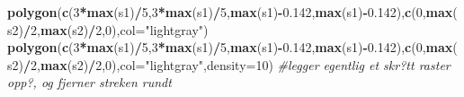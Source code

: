 \documentclass[]{article}
\newenvironment{Shaded}{\begin{snugshade}}{\end{snugshade}}
\newcommand{\CommentTok}[1]{\textcolor[rgb]{0.56,0.35,0.01}{\textit{#1}}}
\newcommand{\DataTypeTok}[1]{\textcolor[rgb]{0.13,0.29,0.53}{#1}}
\newcommand{\DecValTok}[1]{\textcolor[rgb]{0.00,0.00,0.81}{#1}}
\newcommand{\FloatTok}[1]{\textcolor[rgb]{0.00,0.00,0.81}{#1}}
\newcommand{\KeywordTok}[1]{\textcolor[rgb]{0.13,0.29,0.53}{\textbf{#1}}}
\newcommand{\NormalTok}[1]{#1}
\newcommand{\OperatorTok}[1]{\textcolor[rgb]{0.81,0.36,0.00}{\textbf{#1}}}
\newcommand{\StringTok}[1]{\textcolor[rgb]{0.31,0.60,0.02}{#1}}
\begin{document}
\begin{Shaded}
\begin{Highlighting}[]
\KeywordTok{polygon}\NormalTok{(}\KeywordTok{c}\NormalTok{(}\DecValTok{3}\OperatorTok{*}\KeywordTok{max}\NormalTok{(s1)}\OperatorTok{/}\DecValTok{5}\NormalTok{,}\DecValTok{3}\OperatorTok{*}\KeywordTok{max}\NormalTok{(s1)}\OperatorTok{/}\DecValTok{5}\NormalTok{,}\KeywordTok{max}\NormalTok{(s1)}\OperatorTok{-}\FloatTok{0.142}\NormalTok{,}\KeywordTok{max}\NormalTok{(s1)}\OperatorTok{-}\FloatTok{0.142}\NormalTok{),}\KeywordTok{c}\NormalTok{(}\DecValTok{0}\NormalTok{,}\KeywordTok{max}\NormalTok{(s2)}\OperatorTok{/}\DecValTok{2}\NormalTok{,}\KeywordTok{max}\NormalTok{(s2)}\OperatorTok{/}\DecValTok{2}\NormalTok{,}\DecValTok{0}\NormalTok{),}\DataTypeTok{col=}\StringTok{"lightgray"}\NormalTok{)}
\KeywordTok{polygon}\NormalTok{(}\KeywordTok{c}\NormalTok{(}\DecValTok{3}\OperatorTok{*}\KeywordTok{max}\NormalTok{(s1)}\OperatorTok{/}\DecValTok{5}\NormalTok{,}\DecValTok{3}\OperatorTok{*}\KeywordTok{max}\NormalTok{(s1)}\OperatorTok{/}\DecValTok{5}\NormalTok{,}\KeywordTok{max}\NormalTok{(s1)}\OperatorTok{-}\FloatTok{0.142}\NormalTok{,}\KeywordTok{max}\NormalTok{(s1)}\OperatorTok{-}\FloatTok{0.142}\NormalTok{),}\KeywordTok{c}\NormalTok{(}\DecValTok{0}\NormalTok{,}\KeywordTok{max}\NormalTok{(s2)}\OperatorTok{/}\DecValTok{2}\NormalTok{,}\KeywordTok{max}\NormalTok{(s2)}\OperatorTok{/}\DecValTok{2}\NormalTok{,}\DecValTok{0}\NormalTok{),}\DataTypeTok{col=}\StringTok{"lightgray"}\NormalTok{,}\DataTypeTok{density=}\DecValTok{10}\NormalTok{) }\CommentTok{#legger egentlig et skr?tt raster opp?, og fjerner streken rundt}


\end{Highlighting}
\end{Shaded}
\end{document}
